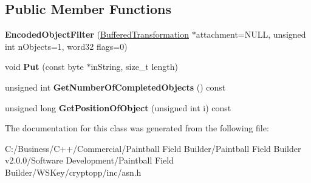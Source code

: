 \subsection*{Public Member Functions}
\begin{DoxyCompactItemize}
\item 
\hypertarget{class_encoded_object_filter_aa1c91e529a12a6f132ba4a9e513b81dd}{
{\bfseries EncodedObjectFilter} (\hyperlink{class_buffered_transformation}{BufferedTransformation} $\ast$attachment=NULL, unsigned int nObjects=1, word32 flags=0)}
\label{class_encoded_object_filter_aa1c91e529a12a6f132ba4a9e513b81dd}

\item 
\hypertarget{class_encoded_object_filter_aecdfd9aa4a927b559472d80339bfb9c1}{
void {\bfseries Put} (const byte $\ast$inString, size\_\-t length)}
\label{class_encoded_object_filter_aecdfd9aa4a927b559472d80339bfb9c1}

\item 
\hypertarget{class_encoded_object_filter_a7f153e8d6eecf40270aecd311766aa3d}{
unsigned int {\bfseries GetNumberOfCompletedObjects} () const }
\label{class_encoded_object_filter_a7f153e8d6eecf40270aecd311766aa3d}

\item 
\hypertarget{class_encoded_object_filter_abf2e20b8b8f139594da8690b8866a2dc}{
unsigned long {\bfseries GetPositionOfObject} (unsigned int i) const }
\label{class_encoded_object_filter_abf2e20b8b8f139594da8690b8866a2dc}

\end{DoxyCompactItemize}


The documentation for this class was generated from the following file:\begin{DoxyCompactItemize}
\item 
C:/Business/C++/Commercial/Paintball Field Builder/Paintball Field Builder v2.0.0/Software Development/Paintball Field Builder/WSKey/cryptopp/inc/asn.h\end{DoxyCompactItemize}
